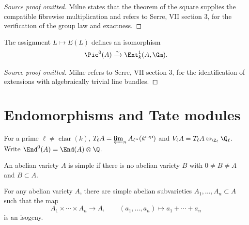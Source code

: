 \begin{proof}[Source proof omitted]
Milne states that the theorem of the square supplies the compatible fibrewise
multiplication and refers to Serre, VII section 3, for the verification of the
group law and exactness.
\end{proof}

\begin{proposition}\label{prop:milne-pic0-ext-classification}
The assignment $L\mapsto E(L)$ defines an isomorphism
\[
\Pic^0(A)\xrightarrow{\sim}\Ext^1_k(A,\Gm).
\]
\end{proposition}

\begin{proof}[Source proof omitted]
Milne refers to Serre, VII section 3, for the identification of extensions
with algebraically trivial line bundles.
\end{proof}

\section{Endomorphisms and Tate modules}

\begin{definition}
\label{def:milne-tate-module}

For a prime $\ell\ne\operatorname{char}(k)$,
$T_\ell A=\varprojlim_n A_{\ell^n}(k^{\mathrm{sep}})$ and
$V_\ell A=T_\ell A\otimes_{\Z_\ell}\Q_\ell$.  Write
$\End^0(A)=\End(A)\otimes\Q$.
\end{definition}

\begin{definition}
\label{def:milne-simple-abelian-variety}

An abelian variety $A$ is simple if there is no abelian variety $B$ with
$0\ne B\ne A$ and $B\subset A$.
\end{definition}

\begin{proposition}
\label{prop:milne-simple-isogeny-decomposition}

For any abelian variety $A$, there are simple abelian subvarieties
$A_1,\ldots,A_n\subset A$ such that the map
\[
A_1\times\cdots\times A_n\longrightarrow A,
\qquad (a_1,\ldots,a_n)\longmapsto a_1+\cdots+a_n
\]
is an isogeny.
\end{proposition}

